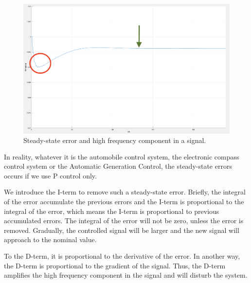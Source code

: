\begin{figure}[htbp]
\centering
\includegraphics[width = .891\textwidth]{figure/3_2_steady.png}
\caption{Steady-state error and high frequency component in a signal.}
\label{3_2_steady}
\end{figure}

In reality, whatever it is the automobile control system, the electronic compass control system or the Automatic Generation Control, the steady-state errors occurs if we use P control only. 

We introduce the I-term to remove such a steady-state error. Briefly, the integral of the error accumulate the previous errors and the I-term is proportional to the integral of the error, which means the I-term is proportional to previous accumulated errors. The integral of the error will not be zero, unless the error is removed. Gradually, the controlled signal will be larger and the new signal will approach to the nominal value. 

To the D-term, it is proportional to the derivative of the error. In another way, the D-term is proportional to the gradient of the signal. Thus, the D-term amplifies the high frequency component in the signal and will disturb the system. 